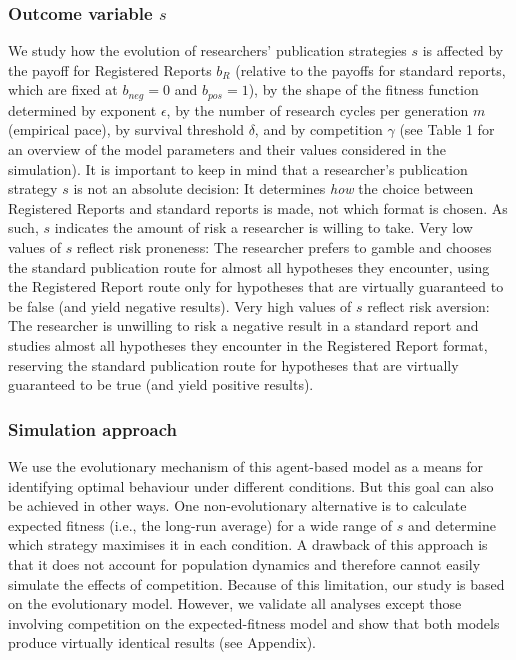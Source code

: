 \documentclass[
  ,man,mask,floatsintext]{apa6}
\begin{document}
\hypertarget{outcome-variable-s}{%
\subsubsection{\texorpdfstring{Outcome variable \(s\)}{Outcome variable s}}\label{outcome-variable-s}}

We study how the evolution of researchers' publication strategies \(s\) is affected by the payoff for Registered Reports \(b_{R}\) (relative to the payoffs for standard reports, which are fixed at \(b_{neg} = 0\) and \(b_{pos} = 1\)), by the shape of the fitness function determined by exponent \(\epsilon\), by the number of research cycles per generation \(m\) (empirical pace), by survival threshold \(\delta\), and by competition \(\gamma\) (see Table 1 for an overview of the model parameters and their values considered in the simulation).
It is important to keep in mind that a researcher's publication strategy \(s\) is
not an absolute decision:
It determines \emph{how} the choice between Registered Reports and standard reports is made, not which format is chosen.
As such, \(s\) indicates the amount of risk a researcher is willing to take.
Very low values of \(s\) reflect risk proneness:
The researcher prefers to gamble and chooses the standard publication route for almost all hypotheses they encounter, using the Registered Report route only for hypotheses that are virtually guaranteed to be false (and yield negative results).
Very high values of \(s\) reflect risk aversion:
The researcher is unwilling to risk a negative result in a standard report and studies almost all hypotheses they encounter in the Registered Report format, reserving the standard publication route for hypotheses that are virtually guaranteed to be true (and yield positive results).

\hypertarget{simulation-approach}{%
\subsubsection{Simulation approach}\label{simulation-approach}}

We use the evolutionary mechanism of this agent-based model as a means for identifying optimal behaviour under different conditions.
But this goal can also be achieved in other ways.
One non-evolutionary alternative is to calculate expected fitness (i.e., the long-run average) for a wide range of \(s\) and determine which strategy maximises it in each condition.
A drawback of this approach is that it does not account for population dynamics and therefore cannot easily simulate the effects of competition.
Because of this limitation, our study is based on the evolutionary model.
However, we validate all analyses except those involving competition on the expected-fitness model and show that both models produce virtually identical results (see Appendix).
\end{document}
